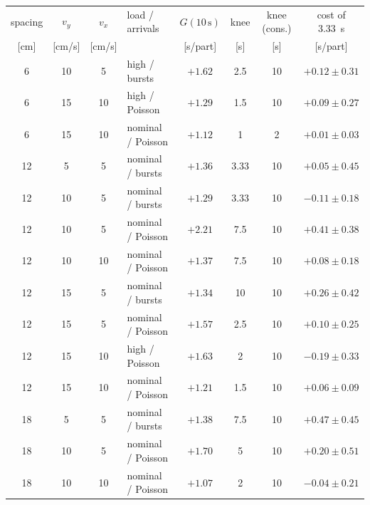 \begin{tabular}{@{}cccl cccc@{}}
\toprule
spacing & $v_y$ & $v_x$ & load / arrivals & $G(10\,\mathrm{s})$ & knee & knee (cons.) & cost of 3.33~s \\
{[cm]} & [cm/s] & [cm/s] & & [s/part] & [s] & [s] & [s/part] \\
\midrule
6 & 10 & 5 & high / bursts & $+1.62$ & 2.5 & 10 & $+0.12 \pm 0.31$ \\
6 & 15 & 10 & high / Poisson & $+1.29$ & 1.5 & 10 & $+0.09 \pm 0.27$ \\
6 & 15 & 10 & nominal / Poisson & $+1.12$ & 1 & 2 & $+0.01 \pm 0.03$ \\
12 & 5 & 5 & nominal / bursts & $+1.36$ & 3.33 & 10 & $+0.05 \pm 0.45$ \\
12 & 10 & 5 & nominal / bursts & $+1.29$ & 3.33 & 10 & $-0.11 \pm 0.18$ \\
12 & 10 & 5 & nominal / Poisson & $+2.21$ & 7.5 & 10 & {\boldmath$+0.41 \pm 0.38$} \\
12 & 10 & 10 & nominal / Poisson & $+1.37$ & 7.5 & 10 & $+0.08 \pm 0.18$ \\
12 & 15 & 5 & nominal / bursts & $+1.34$ & 10 & 10 & $+0.26 \pm 0.42$ \\
12 & 15 & 5 & nominal / Poisson & $+1.57$ & 2.5 & 10 & $+0.10 \pm 0.25$ \\
12 & 15 & 10 & high / Poisson & $+1.63$ & 2 & 10 & $-0.19 \pm 0.33$ \\
12 & 15 & 10 & nominal / Poisson & $+1.21$ & 1.5 & 10 & $+0.06 \pm 0.09$ \\
18 & 5 & 5 & nominal / bursts & $+1.38$ & 7.5 & 10 & {\boldmath$+0.47 \pm 0.45$} \\
18 & 10 & 5 & nominal / Poisson & $+1.70$ & 5 & 10 & $+0.20 \pm 0.51$ \\
18 & 10 & 10 & nominal / Poisson & $+1.07$ & 2 & 10 & $-0.04 \pm 0.21$ \\
\bottomrule
\end{tabular}

